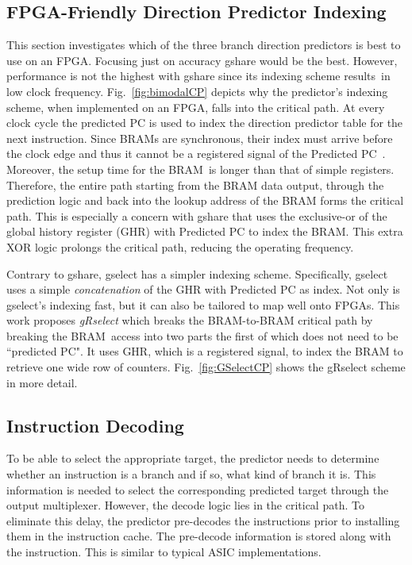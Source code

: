 \subsection{FPGA-Friendly Direction Predictor Indexing}
\label{sec:fpga:indexing}
This section investigates which of the three branch direction predictors is best to use on an FPGA. Focusing just on accuracy gshare would be the best. However, performance is not the highest with gshare since its indexing scheme results\ in low clock frequency. Fig.~\ref{fig:bimodalCP} depicts why the predictor's indexing scheme, when implemented on an FPGA, falls into the critical path. At every clock cycle the predicted PC is used to index the direction predictor table for the next instruction. Since BRAMs are synchronous, their index must arrive before the clock edge and thus it cannot be a registered signal of the Predicted PC~\cite{StratixIVM9K}. Moreover, the setup time for the BRAM\ is longer than that of simple registers. Therefore, the entire path starting from the BRAM data output, through the prediction logic and back into the lookup address of the BRAM forms the critical path. This is especially a concern with gshare that uses the exclusive-or of the global history register (GHR) with Predicted PC to index the BRAM. This extra XOR logic prolongs the critical path, reducing the operating frequency.

Contrary to gshare, gselect has a simpler indexing scheme. Specifically, gselect uses a simple \textit{concatenation} of the GHR with Predicted PC as index. Not only is gselect's indexing fast, but it can also  be tailored to map well onto FPGAs. This work proposes \textit{gRselect} which breaks the BRAM-to-BRAM critical path by breaking the BRAM\ access into two parts the first of which does not need to be ``predicted PC". It uses GHR, which is a registered signal, to index the BRAM to retrieve one wide row of counters. Fig.~\ref{fig:GSelectCP} shows the gRselect scheme in more detail.


\subsection{Instruction Decoding}
\label{sec:fpga:predecode}
To be able to select the appropriate target, the predictor needs to determine whether an instruction is a branch and if so, what kind of branch it is. This information is needed to select the corresponding predicted target through the output multiplexer. However, the decode logic lies in the critical path. To eliminate this delay, the predictor pre-decodes the instructions prior to installing them in the instruction cache. The pre-decode information is stored along with the instruction. This is similar to  typical ASIC implementations.



